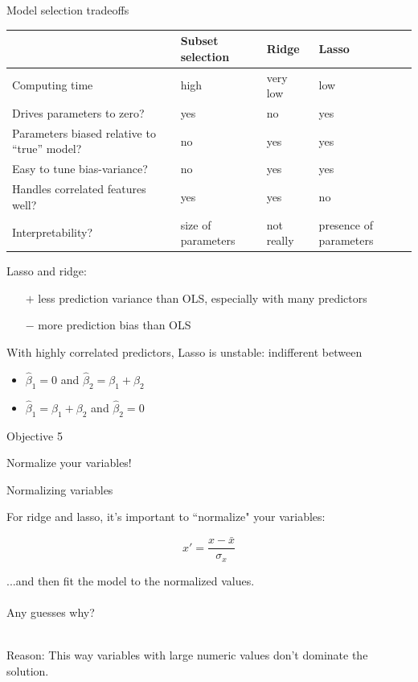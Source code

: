 \documentclass[mathserif, aspectratio=169]{beamer}
\begin{document}
\begin{frame}{Model selection tradeoffs}
\begin{table}[]
\begin{tabular}{p{6cm}p{2.2cm}p{2.2cm}p{2.2cm}}
\hline
                                              & Subset selection & Ridge    & Lasso \\ \hline
Computing time             \pause                   & high             & very low & low   \\
Drives parameters to zero?      \pause              & yes              & no       & yes   \\
Parameters biased relative to ``true'' model? \pause & no               & yes      & yes   \\
Easy to tune bias-variance?          \pause         & no               & yes      & yes   \\
Handles correlated features well?     \pause        & yes              & yes      & no    \\
Interpretability?	  \pause    & size of parameters & not really  & presence of parameters\\
 \hline
\end{tabular}
\end{table}

Lasso and ridge: 
\begin{itemize}
\item[$+$] less prediction variance than OLS, especially with many  predictors 
\item[$-$] more prediction bias than OLS
\end{itemize}
With highly correlated predictors, Lasso is unstable: indifferent between 
\begin{itemize}
\item $\hat{\beta}_1=0$ and $\hat{\beta}_2= \beta_1+\beta_2$
\item $\hat{\beta}_1= \beta_1+\beta_2$ and $\hat{\beta}_2=0$
\end{itemize}
\end{frame}

\begin{frame}{Objective 5}

Normalize your variables!

\end{frame}

\begin{frame}{Normalizing variables}

For ridge and lasso, it's important to ``normalize" your variables:

\begin{equation}
x' = \frac{x - \bar{x}}{\sigma_x}
\end{equation}

...and then fit the model to the normalized values.  \\~\\

Any guesses why?\\~\\

\pause

Reason: This way variables with large numeric values don't dominate the solution.  

\end{frame}
\end{document}
